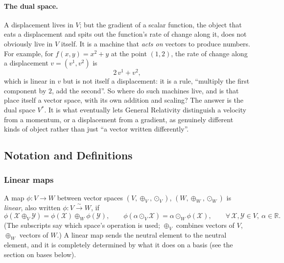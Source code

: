 \documentclass[11pt]{article}
\newcommand{\dual}{V^{*}}
\newcommand{\linto}{\overset{\sim}{\longrightarrow}}
\begin{document}
\paragraph{The dual space.}
A displacement lives in $V$; but the gradient of a scalar function, the object that eats a displacement and spits out the function's rate of change along it, does not obviously live in $V$ itself. It is a machine that \emph{acts on} vectors to produce numbers. For example, for $f(x,y)=x^2+y$ at the point $(1,2)$, the rate of change along a displacement $v=(v^1,v^2)$ is
\[
2\,v^1+v^2,
\]
which is linear in $v$ but is not itself a displacement: it is a rule, ``multiply the first component by $2$, add the second''. So where do such machines live, and is that place itself a vector space, with its own addition and scaling? The answer is the dual space $\dual$. It is what eventually lets General Relativity distinguish a velocity from a momentum, or a displacement from a gradient, as genuinely different kinds of object rather than just ``a vector written differently''.

\subsection*{Notation and Definitions}

\subsubsection*{Linear maps}
A map $\phi:V\to W$ between vector spaces $(V,\oplus_V,\odot_V)$, $(W,\oplus_W,\odot_W)$ is \emph{linear}, also written $\phi:V\linto W$, if
\[
\phi(\mathcal X\oplus_V\mathcal Y)=\phi(\mathcal X)\oplus_W\phi(\mathcal Y), \qquad \phi(\alpha\odot_V\mathcal X)=\alpha\odot_W\phi(\mathcal X), \qquad \forall\, \mathcal X,\mathcal Y\in V,\ \alpha\in\mathbb R.
\]
(The subscripts say which space's operation is used; $\oplus_V$ combines vectors of $V$, $\oplus_W$ vectors of $W$.) A linear map sends the neutral element to the neutral element, and it is completely determined by what it does on a basis (see the section on bases below).
\end{document}
